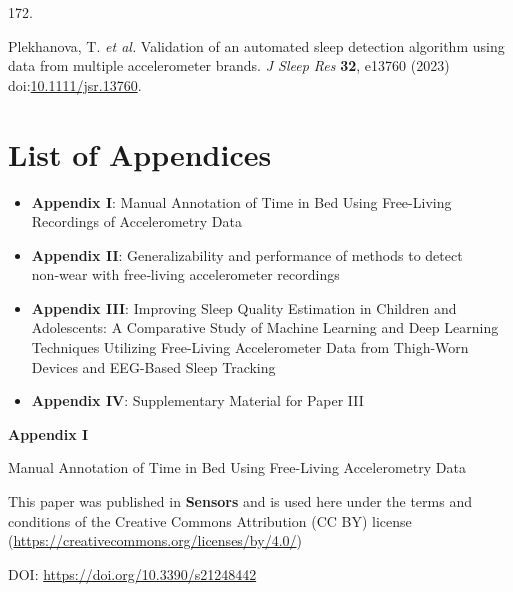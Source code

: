 \documentclass[
  10pt,
]{scrbook}
\newlength{\cslhangindent}
\newlength{\csllabelwidth}
\newlength{\cslentryspacingunit} %
\newenvironment{CSLReferences}[2] %
 {%
  \setlength{\parindent}{0pt}
  \ifodd #1
  \let\oldpar\par
  \def\par{\hangindent=\cslhangindent\oldpar}
  \fi
  \setlength{\parskip}{#2\cslentryspacingunit}
 }%
 {}
\newcommand{\CSLLeftMargin}[1]{\parbox[t]{\csllabelwidth}{#1}}
\newcommand{\CSLRightInline}[1]{\parbox[t]{\linewidth - \csllabelwidth}{#1}\break}
\let\originaltextbf\textbf
\renewcommand{\textbf}[1]{\textcolor{color1}{\originaltextbf{#1}}}
\begin{document}
\begin{CSLReferences}{0}{0}
\leavevmode{}%
\CSLLeftMargin{172. }%
\CSLRightInline{Plekhanova, T. \emph{et al.} Validation of an automated
sleep detection algorithm using data from multiple accelerometer brands.
\emph{J Sleep Res} \textbf{32}, e13760 (2023)
doi:\href{https://doi.org/10.1111/jsr.13760}{10.1111/jsr.13760}.}

\end{CSLReferences}

\hypertarget{list-of-appendices}{%
\chapter{List of Appendices}\label{list-of-appendices}}

\begin{itemize}
\item
  \textbf{Appendix I}: Manual Annotation of Time in Bed Using
  Free-Living Recordings of Accelerometry Data
\item
  \textbf{Appendix II}: Generalizability and performance of methods to
  detect non‑wear with free‑living accelerometer recordings
\item
  \textbf{Appendix III}: Improving Sleep Quality Estimation in Children
  and Adolescents: A Comparative Study of Machine Learning and Deep
  Learning Techniques Utilizing Free-Living Accelerometer Data from
  Thigh-Worn Devices and EEG-Based Sleep Tracking
\item
  \textbf{Appendix IV}: Supplementary Material for Paper III
\end{itemize}

\newpage

\begin{center}

\textbf{\textsf{\Huge Appendix I}}



\vspace{2cm}

\textsf{\Huge Manual Annotation of Time in Bed Using Free-Living Accelerometry Data}

\vspace{5cm}

This paper was published in \textbf{Sensors} and is used here under the terms and conditions of the Creative Commons Attribution (CC BY) license (\href{https://creativecommons.org/licenses/by/4.0/}{https://creativecommons.org/licenses/by/4.0/})

\vspace{1cm}

DOI: \href{https://doi.org/10.3390/s21248442}{https://doi.org/10.3390/s21248442}

\end{center}
\end{document}
